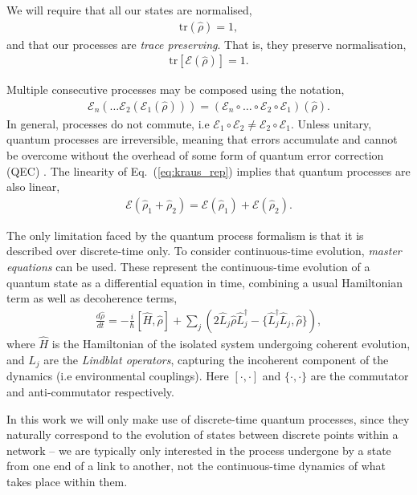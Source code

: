\documentclass[aps, rmp, twocolumn, amsmath, amssymb, nofootinbib, superscriptaddress, longbibliography, floatfix, table-of-contents, eqsecnum]{revtex4-1}
\begin{document}
We will require that all our states are normalised,
\begin{align}
\text{tr}(\hat\rho) = 1,
\end{align}
and that our processes are \textit{trace preserving}. That is, they preserve normalisation,
\begin{align}
\text{tr}[\mathcal{E}(\hat\rho)] = 1.
\end{align}

Multiple consecutive processes may be composed using the notation,
\begin{align}
\mathcal{E}_n(\dots \mathcal{E}_2(\mathcal{E}_1(\hat\rho)))=(\mathcal{E}_n \circ \dots \circ \mathcal{E}_2\circ\mathcal{E}_1)(\hat\rho).
\end{align}
In general, processes do not commute, i.e \mbox{$\mathcal{E}_1\circ \mathcal{E}_2 \neq \mathcal{E}_2\circ \mathcal{E}_1$}. Unless unitary, quantum processes are irreversible, meaning that errors accumulate and cannot be overcome without the overhead of some form of quantum error correction (QEC) \cite{bib:Shor95, bib:CalderbankShor96, bib:NielsenChuang00}. The linearity of Eq.~(\ref{eq:kraus_rep}) implies that quantum processes are also linear,
\begin{align}
	\mathcal{E}(\hat\rho_1+\hat\rho_2) = \mathcal{E}(\hat\rho_1)+\mathcal{E}(\hat\rho_2).
\end{align}

The only limitation faced by the quantum process formalism is that it is described over discrete-time only. To consider continuous-time evolution, \textit{master equations} can be used. These represent the continuous-time evolution of a quantum state as a differential equation in time, combining a usual Hamiltonian term as well as decoherence terms,
\begin{align}
\frac{d\hat\rho}{dt} = -\frac{i}{\hbar}[\hat{H},\hat\rho] + \sum_j (2\hat{L}_j\hat\rho\hat{L}_j^\dag - \{\hat{L}_j^\dag\hat{L}_j,\hat\rho\}),
\end{align}
where $\hat{H}$ is the Hamiltonian of the isolated system undergoing coherent evolution, and $\hat{L}_j$ are the \textit{Lindblat operators}, capturing the incoherent component of the dynamics (i.e environmental couplings). Here $[\cdot,\cdot]$ and $\{\cdot,\cdot\}$ are the commutator and anti-commutator respectively.

In this work we will only make use of discrete-time quantum processes, since they naturally correspond to the evolution of states between discrete points within a network -- we are typically only interested in the process undergone by a state from one end of a link to another, not the continuous-time dynamics of what takes place within them.
\end{document}
